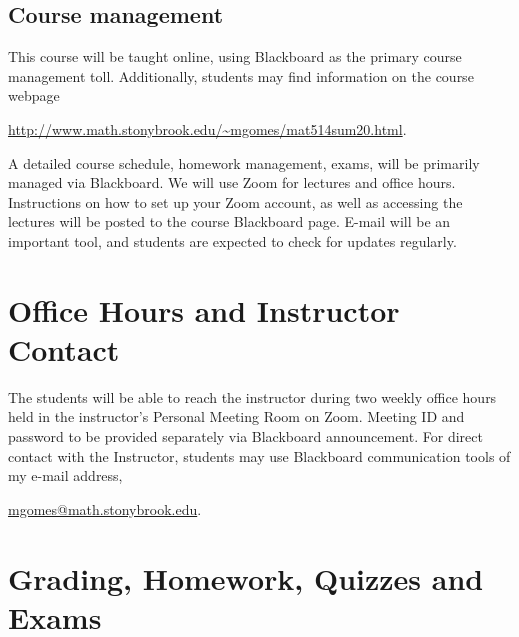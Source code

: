 \documentclass[11pt]{amsart}
\numberwithin{equation}{section}
\begin{document}
\subsection{Course management}

This course will be taught online, using Blackboard as the primary course management toll. Additionally, students may find information on the course webpage
\begin{center}
\url{http://www.math.stonybrook.edu/~mgomes/mat514sum20.html}.
\end{center}

A detailed course schedule, homework management, exams, will be primarily managed via Blackboard. We will use Zoom for lectures and office hours. Instructions on how to set up your Zoom account, as well as accessing the lectures will be posted to the course Blackboard page. E-mail will be an important tool, and students are expected to check for updates regularly.

\section{Office Hours and Instructor Contact}

The students will be able to reach the instructor during two weekly office hours held in the instructor's Personal Meeting Room on Zoom. Meeting ID and password to be provided separately via Blackboard announcement. For direct contact with the Instructor, students may use Blackboard communication tools of my e-mail address,
\begin{center}
\href{mailto: mgomes@math.stonybrook.edu}{ mgomes@math.stonybrook.edu}.
\end{center}

\section{Grading, Homework, Quizzes and Exams}
\end{document}
